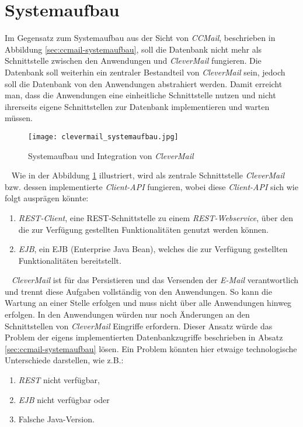 \section{Systemaufbau}
Im Gegensatz zum Systemaufbau aus der Sicht von \emph{CCMail}, beschrieben in Abbildung \ref{sec:ccmail-systemaufbau}, soll die Datenbank nicht mehr als Schnittstelle zwischen den Anwendungen und \emph{CleverMail} fungieren. Die Datenbank soll weiterhin ein zentraler Bestandteil von \emph{CleverMail} sein, jedoch soll die Datenbank von den Anwendungen abstrahiert werden. Damit erreicht man, dass die Anwendungen eine einheitliche Schnittstelle nutzen und nicht ihrerseits eigene Schnittstellen zur Datenbank implementieren und warten müssen.
\newpage
\begin{figure}[h]
\centering
\texttt{[image: clevermail\_systemaufbau.jpg]} %
\caption{Systemaufbau und Integration von \emph{CleverMail}}
\label{fig:clevermail-system-und-integration}
\end{figure}
\ \newline
Wie in der Abbildung \ref{fig:clevermail-system-und-integration} illustriert, wird als zentrale Schnittstelle \emph{CleverMail} bzw. dessen implementierte \emph{Client-API} fungieren, wobei diese \emph{Client-API} sich wie folgt ausprägen könnte:
\begin{enumerate}
	\item\emph{REST-Client}, eine REST-Schnittstelle zu einem \emph{REST-Webservice}, über den die zur Verfügung gestellten Funktionalitäten genutzt werden können.
	\item\emph{EJB}, ein EJB (Enterprise Java Bean), welches die zur Verfügung gestellten Funktionalitäten bereitstellt.
\end{enumerate}
\ \newline
\emph{CleverMail} ist für das Persistieren und das Versenden der \emph{E-Mail} verantwortlich und trennt diese Aufgaben vollständig von den Anwendungen. So kann die Wartung an einer Stelle erfolgen und muss nicht über alle Anwendungen hinweg erfolgen. In den Anwendungen würden nur noch Änderungen an den Schnittstellen von \emph{CleverMail} Eingriffe erfordern.
\newline
\newline
Dieser Ansatz würde das Problem der eigens implementierten Datenbankzugriffe beschrieben in Absatz \ref{sec:ccmail-systemaufbau} lösen. Ein Problem könnten hier etwaige technologische Unterschiede darstellen, wie z.B.:
\begin{enumerate}
	\item \emph{REST} nicht verfügbar,
	\item \emph{EJB} nicht verfügbar oder
	\item Falsche Java-Version.
\end{enumerate}
